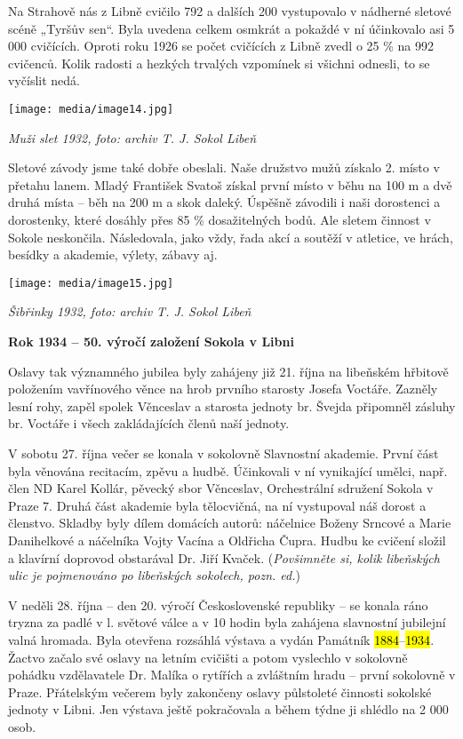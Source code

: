 Na Strahově nás z Libně cvičilo 792 a dalších 200 vystupovalo v nádherné
sletové scéně „Tyršův sen``. Byla uvedena celkem osmkrát a pokaždé v ní
účinkovalo asi 5 000 cvičících. Oproti roku 1926 se počet cvičících z
Libně zvedl o 25 \% na 992 cvičenců. Kolik radosti a hezkých trvalých
vzpomínek si všichni odnesli, to se vyčíslit nedá.

\texttt{[image: media/image14.jpg]}

\emph{Muži slet 1932, foto: archiv T. J. Sokol Libeň}

Sletové závody jsme také dobře obeslali. Naše družstvo mužů získalo 2.
místo v přetahu lanem. Mladý František Svatoš získal první místo v běhu
na 100 m a dvě druhá místa -- běh na 200 m a skok daleký. Úspěšně
závodili i naši dorostenci a dorostenky, které dosáhly přes 85 \%
dosažitelných bodů. Ale sletem činnost v Sokole neskončila. Následovala,
jako vždy, řada akcí a soutěží v atletice, ve hrách, besídky a akademie,
výlety, zábavy aj.

\texttt{[image: media/image15.jpg]}

\emph{Šibřinky 1932, foto: archiv T. J. Sokol Libeň}

\textbf{Rok 1934 -- 50. výročí založení Sokola v Libni}

Oslavy tak významného jubilea byly zahájeny již 21. října na libeňském
hřbitově položením vavřínového věnce na hrob prvního starosty Josefa
Voctáře. Zazněly lesní rohy, zapěl spolek Věnceslav a starosta jednoty
br. Švejda připomněl zásluhy br. Voctáře i všech zakládajících členů
naší jednoty.

V sobotu 27. října večer se konala v sokolovně Slavnostní akademie.
První část byla věnována recitacím, zpěvu a hudbě. Účinkovali v ní
vynikající umělci, např. člen ND Karel Kollár, pěvecký sbor Věnceslav,
Orchestrální sdružení Sokola v Praze 7. Druhá část akademie byla
tělocvičná, na ní vystupoval náš dorost a členstvo. Skladby byly dílem
domácích autorů: náčelnice Boženy Srncové a Marie Danihelkové a
náčelníka Vojty Vacína a Oldřicha Čupra. Hudbu ke cvičení složil a
klavírní doprovod obstarával Dr. Jiří Kvaček. (\emph{Povšimněte si,
kolik libeňských ulic je pojmenováno po libeňských sokolech, pozn. ed.})

V neděli 28. října -- den 20. výročí Československé republiky -- se
konala ráno tryzna za padlé v l. světové válce a v 10 hodin byla
zahájena slavnostní jubilejní valná hromada. Byla otevřena rozsáhlá
výstava a vydán Památník \hl{1884}--\hl{1934}. Žactvo začalo své oslavy
na letním cvičišti a potom vyslechlo v sokolovně pohádku vzdělavatele
Dr. Malíka o rytířích a zvláštním hradu -- první sokolovně v Praze.
Přátelským večerem byly zakončeny oslavy půlstoleté činnosti sokolské
jednoty v Libni. Jen výstava ještě pokračovala a během týdne ji shlédlo
na 2 000 osob.

